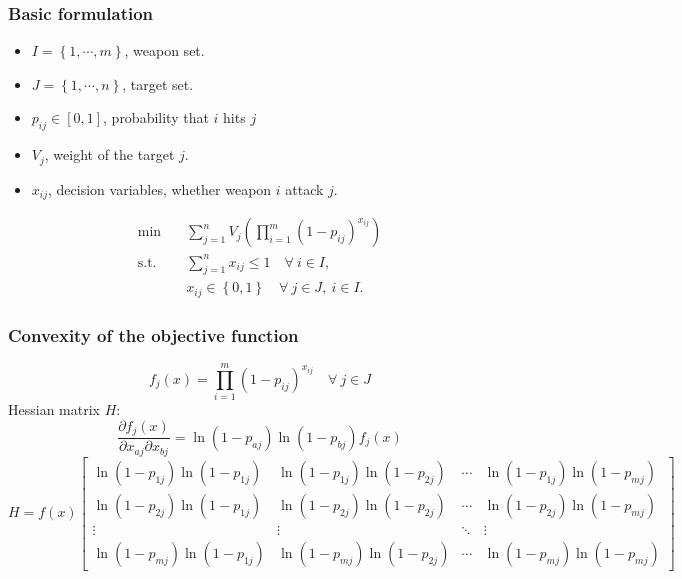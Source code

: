 \documentclass[CJK,10pt]{beamer}
\begin{document}
\begin{frame}
	\frametitle{Basic formulation}
	\begin{itemize}
		\item $I = \left\{1,\cdots,m\right\} $, weapon set.
		\item $J = \left\{1,\cdots,n\right\} $, target set.
		\item $p_{ij}\in [0,1]$, probability that $i$ hits $j$
		\item $V_j$, weight of the target $j$.
		\item $x_{ij}$, decision variables, whether weapon $i$ attack $j$.
	\end{itemize}
	
	\begin{align}
		\min\quad & \sum_{j=1}^n V_j \left( \prod_{i=1}^m (1 -  p_{ij})^{x_{ij}} \right) \\ 
		\mathrm{s. t.}\quad &\sum_{j=1}^n x_{ij} \leq 1\quad \forall ~i \in I,\\
		& x_{ij} \in \left\{ 0,1 \right\} \quad \forall~ j\in J , ~ i \in I.
	\end{align}
\end{frame}


\begin{frame}
    \frametitle{Convexity of the objective function}
    \begin{equation*}
        f_j(x) =  \prod_{i=1}^m (1 -  p_{ij})^{x_{ij}}\quad \forall~  j \in J
    \end{equation*}
    Hessian matrix $H$:
    \begin{equation*}
        \frac{\partial f_j(x)}{\partial x_{aj} \partial x_{bj}} = \ln(1 - p_{aj}) \ln(1 - p_{bj}) f_j(x)
    \end{equation*}
    {
    \scriptsize
    \begin{equation*}
        H = f(x)\begin{bmatrix}
            \ln(1 - p_{1j}) \ln(1 - p_{1j}) & \ln(1 - p_{1j}) \ln(1 - p_{2j}) &\cdots & \ln(1 - p_{1j}) \ln(1 - p_{mj}) \\
            \ln(1 - p_{2j}) \ln(1 - p_{1j}) & \ln(1 - p_{2j}) \ln(1 - p_{2j}) &\cdots & \ln(1 - p_{2j}) \ln(1 - p_{mj}) \\
            \vdots & \vdots &\ddots &\vdots \\
            \ln(1 - p_{mj}) \ln(1 - p_{1j}) & \ln(1 - p_{mj}) \ln(1 - p_{2j}) &\cdots & \ln(1 - p_{mj}) \ln(1 - p_{mj})
        \end{bmatrix}
    \end{equation*}
    }
\end{frame}
\end{document}
